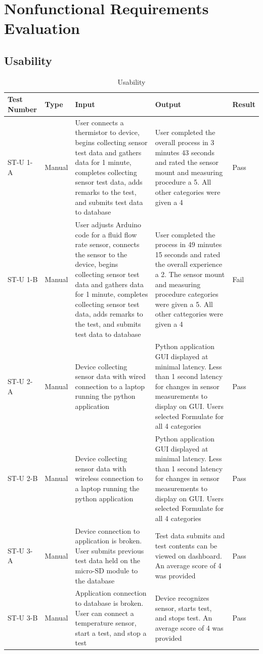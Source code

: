 \documentclass[12pt, titlepage]{article}
\begin{document}
\section{Nonfunctional Requirements Evaluation}
\subsection{Usability}
\newpage
\begin{table}[H]
  \begin{tabular}{| p{} | p{}| p{}| p{}| p{}|}
    \hline
    \rowcolor[gray]{0.9}
    Test Number & Type & Input & Output & Result\\
    \hline
    ST-U 1-A & Manual & User connects a thermistor to device, begins collecting sensor test data and gathers data for 1 minute, completes collecting sensor test data, adds remarks to the test, and submits test data to database & User completed the overall process in 3 minutes 43 seconds and rated the sensor mount and measuring procedure a 5. All other categories were given a 4 & Pass \\
    \hline
    ST-U 1-B & Manual & User adjusts Arduino code for a fluid flow rate sensor, connects the sensor to the device, begins collecting sensor test data and gathers data for 1 minute, completes collecting sensor test data, adds remarks to the test, and submits test data to database & User completed the process in 49 minutes 15 seconds and rated the overall experience a 2. The sensor mount and measuring procedure categories were given a 5. All other cattegories were given a 4 & Fail \\
    \hline
    ST-U 2-A & Manual & Device collecting sensor data with wired connection to a laptop running the python application & Python application GUI displayed at minimal latency. Less than 1 second latency for changes in sensor measurements to display on GUI. Users selected Formulate for all 4 categories & Pass \\
    \hline
    ST-U 2-B & Manual & Device collecting sensor data with wireless connection to a laptop running the python application & Python application GUI displayed at minimal latency. Less than 1 second latency for changes in sensor measurements to display on GUI. Users selected Formulate for all 4 categories& Pass \\
    \hline

    ST-U 3-A & Manual & Device connection to application is broken. User submits previous test data held on the micro-SD module to the database & Test data submits and test contents can be viewed on dashboard. An average score of 4 was provided & Pass \\
    \hline
    ST-U 3-B & Manual & Application connection to database is broken. User can connect a temperature sensor, start a test, and stop a test & Device recognizes sensor, starts test, and stops test. An average score of 4 was provided & Pass  \\
    \hline
  \end{tabular}
  \caption{Usability}
  \end{table}
\end{document}
